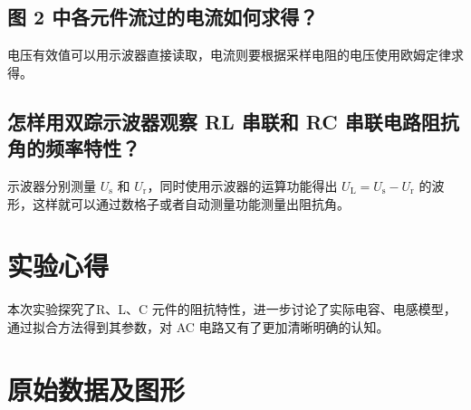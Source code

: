\documentclass[a4paper,utf8]{article}
\begin{document}
    \subsection{图 2 中各元件流过的电流如何求得？}
        电压有效值可以用示波器直接读取，电流则要根据采样电阻的电压使用欧姆定律求得。
    \subsection{怎样用双踪示波器观察 RL 串联和 RC 串联电路阻抗角的频率特性？}
        示波器分别测量 $U_\text{s}$ 和 $U_\text{r}$，同时使用示波器的运算功能得出 $U_\text{L}=U_\text{s}-U_\text{r}$ 的波形，这样就可以通过数格子或者自动测量功能测量出阻抗角。
\section{实验心得}
    本次实验探究了R、L、C 元件的阻抗特性，进一步讨论了实际电容、电感模型，通过拟合方法得到其参数，对 AC 电路又有了更加清晰明确的认知。
    \newpage
    \clearpage
\section{原始数据及图形}
    \begin{center}
        \begin{figure}[!ht]
            \hspace{6mm}
            \\
        \end{figure}\par
    \end{center}
    
\end{document}
